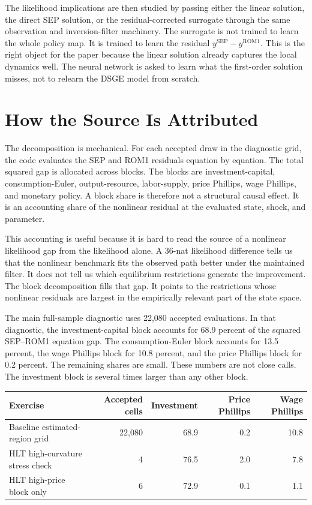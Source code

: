 \documentclass[10pt]{article}
\begin{document}
The likelihood implications are then studied by passing either the linear solution, the direct SEP solution, or the residual-corrected surrogate through the same observation and inversion-filter machinery. The surrogate is not trained to learn the whole policy map. It is trained to learn the residual $y^{\mathrm{SEP}}-y^{\mathrm{ROM1}}$. This is the right object for the paper because the linear solution already captures the local dynamics well. The neural network is asked to learn what the first-order solution misses, not to relearn the DSGE model from scratch.

\section*{How the Source Is Attributed}

The decomposition is mechanical. For each accepted draw in the diagnostic grid, the code evaluates the SEP and ROM1 residuals equation by equation. The total squared gap is allocated across blocks. The blocks are investment-capital, consumption-Euler, output-resource, labor-supply, price Phillips, wage Phillips, and monetary policy. A block share is therefore not a structural causal effect. It is an accounting share of the nonlinear residual at the evaluated state, shock, and parameter.

This accounting is useful because it is hard to read the source of a nonlinear likelihood gap from the likelihood alone. A 36-nat likelihood difference tells us that the nonlinear benchmark fits the observed path better under the maintained filter. It does not tell us which equilibrium restrictions generate the improvement. The block decomposition fills that gap. It points to the restrictions whose nonlinear residuals are largest in the empirically relevant part of the state space.

The main full-sample diagnostic uses 22,080 accepted evaluations. In that diagnostic, the investment-capital block accounts for 68.9 percent of the squared SEP--ROM1 equation gap. The consumption-Euler block accounts for 13.5 percent, the wage Phillips block for 10.8 percent, and the price Phillips block for 0.2 percent. The remaining shares are small. These numbers are not close calls. The investment block is several times larger than any other block.

\begin{center}
\begin{tabular}{lrrrr}
\toprule
Exercise & Accepted cells & Investment & Price Phillips & Wage Phillips \\
\midrule
Baseline estimated-region grid & 22,080 & 68.9 & 0.2 & 10.8 \\
HLT high-curvature stress check & 4 & 76.5 & 2.0 & 7.8 \\
HLT high-price block only & 6 & 72.9 & 0.1 & 1.1 \\
\bottomrule
\end{tabular}
\end{center}
\end{document}
